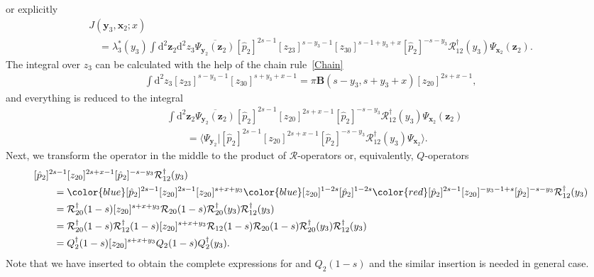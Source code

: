 \documentclass[10pt,a4paper]{amsart}
\newcommand{\blue}{\color{blue}}
\newcommand{\red}{\color{red}}
\newcommand{\II}{\hbox{{1}\kern-.25em\hbox{l}}}
\numberwithin{equation}{section}
\begin{document}
or explicitly
\begin{gather*}
J(\bm{y}_3,\bm{x}_2;x) \\
\quad =
\lambda_3^\ast(y_3)
\int
\mathrm{d}^{2}\bm{z}_2
\mathrm{d}^{2} z_3
\overline{\Psi_{\bm{y}_2}(\bm{z}_2)}
[\hat{p}_2]^{2s-1} [z_{23}]^{s-y_3-1} [z_{30}]^{s-1+y_3+x}
[\hat{p}_2]^{-s-y_3}
\mathcal{R}^{\dagger}_{12}(y_3) \Psi_{\bm{x}_2}(\bm{z}_2).
\end{gather*}
The integral over $z_3$ can be calculated with the help of the
chain rule~\eqref{Chain}
\begin{align*}
\int \mathrm{d}^2 z_3 [z_{23}]^{s-y_3-1} [z_{30}]^{s+y_3+x-1} =
\pi \mathbf{B}(s-y_3,s+y_3+x)
[z_{20}]^{2s+x-1},
\end{align*}
and everything is reduced to the integral
\begin{align*}
&
\int
\mathrm{d}^{2}\bm{z}_2
\overline{\Psi_{\bm{y}_2}(\bm{z}_2)}
[\hat{p}_2]^{2s-1} [z_{20}]^{2s+x-1}
[\hat{p}_2]^{-s-y_3}
\mathcal{R}^{\dagger}_{12}(y_3) \Psi_{\bm{x}_2}(\bm{z}_2) \\
& \qquad =
\bigl\langle \Psi_{\bm{y}_2}|
[\hat{p}_2]^{2s-1} [z_{20}]^{2s+x-1}
[\hat{p}_2]^{-s-y_3}
\mathcal{R}^{\dagger}_{12}(y_3) \Psi_{\bm{x}_2}
\bigr\rangle .
\end{align*}
Next, we transform the operator in the middle to
the product of $\mathcal{R}$-operators or, equivalently, $Q$-operators
\begin{align*}
&
[\hat{p}_2]^{2s-1} [z_{20}]^{2s+x-1}
[\hat{p}_2]^{-s-y_3} \mathcal{R}^{\dagger}_{12}(y_3) \\
&\qquad{} =
{\blue [\hat{p}_2]^{2s-1} [z_{20}]^{2s-1}}
[z_{20}]^{s+x+y_3}
{\blue [z_{20}]^{1-2s} [\hat{p}_2]^{1-2s}}
{\red [\hat{p}_2]^{2s-1} [z_{20}]^{-y_3-1+s}
[\hat{p}_2]^{-s-y_3}} \mathcal{R}^{\dagger}_{12}(y_3) \\
&\qquad{} =
\mathcal{R}^{\dagger}_{20}(1-s)
[z_{20}]^{s+x+y_3}
\mathcal{R}_{20}(1-s)
\mathcal{R}^{\dagger}_{20}(y_3)
\mathcal{R}^{\dagger}_{12}(y_3) \\
&\qquad{} =
\mathcal{R}^{\dagger}_{20}(1-s) \mathcal{R}^{\dagger}_{12}(1-s)
[z_{20}]^{s+x+y_3}
\mathcal{R}_{12}(1-s) \mathcal{R}_{20}(1-s)
\mathcal{R}^{\dagger}_{20}(y_3)
\mathcal{R}^{\dagger}_{12}(y_3) \\
&\qquad{} =
Q^{\dagger}_2(1-s)
[z_{20}]^{s+x+y_3}
Q_2(1-s) Q^{\dagger}_2(y_3) .
\end{align*}
Note that we have inserted
\smash{$\mathcal{R}^{\dagger}_{12}(1-s) \mathcal{R}_{12}(1-s) = \II$}
to obtain the complete expressions for 
and $Q_2(1-s)$ and the similar insertion is needed in general case.
\end{document}
